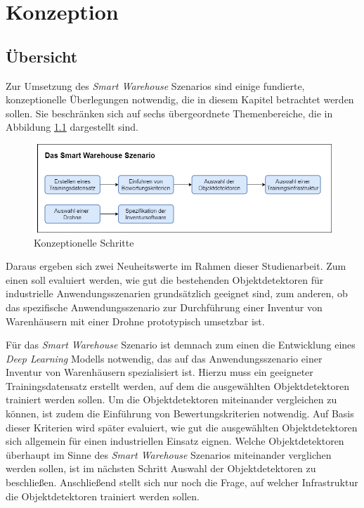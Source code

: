 \chapter{Konzeption}

\section{Übersicht}

Zur Umsetzung des \textit{Smart Warehouse} Szenarios sind einige fundierte, konzeptionelle Überlegungen notwendig, die in diesem Kapitel betrachtet werden sollen. Sie beschränken sich auf sechs übergeordnete Themenbereiche, die in Abbildung \ref{schritte} dargestellt sind. 

\begin{figure}[H]
	\begin{center}
		\includegraphics[width=15cm]{Bilder/blockdiagramm.png} 
		\caption[Konzeptionelle Schritte]{Konzeptionelle Schritte}
		\label{schritte}
	\end{center}
\end{figure}

Daraus ergeben sich zwei Neuheitswerte im Rahmen dieser Studienarbeit. Zum einen soll evaluiert werden, wie gut die bestehenden Objektdetektoren für industrielle Anwendungsszenarien grundsätzlich geeignet sind, zum anderen, ob das spezifische Anwendungsszenario zur Durchführung einer Inventur von Warenhäusern mit einer Drohne prototypisch umsetzbar ist.

Für das \textit{Smart Warehouse} Szenario ist demnach zum einen die Entwicklung eines \textit{Deep Learning} Modells notwendig, das auf das Anwendungsszenario einer Inventur von Warenhäusern spezialisiert ist. Hierzu muss ein geeigneter Trainingsdatensatz erstellt werden, auf dem die ausgewählten Objektdetektoren trainiert werden sollen. Um die Objektdetektoren miteinander vergleichen zu können, ist zudem die Einführung von Bewertungskriterien notwendig. Auf Basis dieser Kriterien wird später evaluiert, wie gut die ausgewählten Objektdetektoren sich allgemein für einen industriellen Einsatz eignen. Welche Objektdetektoren überhaupt im Sinne des \textit{Smart Warehouse} Szenarios miteinander verglichen werden sollen, ist im nächsten Schritt \glqq Auswahl der Objektdetektoren\grqq{} zu beschließen. Anschließend stellt sich nur noch die Frage, auf welcher Infrastruktur die Objektdetektoren trainiert werden sollen.

